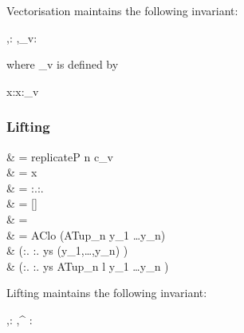 \documentclass{article}
\begin{document}
Vectorisation maintains the following invariant:

\begin{haskell}
\Delta,\Gamma{}:\sigma \Longrightarrow
      \Delta,\Gamma_v\vdash{}:\vect{\sigma}
\end{haskell}

where \<\Gamma_v\> is defined by

\begin{haskell}
x:\sigma\in\Gamma \Longleftrightarrow x:\vect{\sigma}\in\Gamma_v
\end{haskell}

\subsubsection*{Lifting}
\begin{haskell}
 & = replicateP \pa{\vect{\sigma}} n c_v \\
        & = x \\
 & =
\Lambda\alpha:\kappa.:\patype{\alpha:\kappa}. \\
 &  = [\vect{\sigma}] \pa{\vect{\sigma}} \\
 & =  \cappP {} \\
 & = AClo \vect{\sigma} \vect{\phi} \vect{\tau}
                                   \pa{\vect{\tau}}
                                   (ATup_n y_1 \dots y_n) \\
  &
\quad\quad(:\vect{\tau}.
           :\vect{\sigma}.
            ys  (y_1,\dots,y_n) \to {}) \\
  &
\quad\quad(:\parr{\vect{\tau}}.
           :\parr{\vect{\sigma}}.
            ys  ATup_n l y_1 \dots y_n \to {})
\end{haskell}

Lifting maintains the following invariant:

\begin{haskell}
\Delta,\Gamma{}:\sigma \Longrightarrow
  \Delta,\Gamma^\uparrow\vdash{} : 
\end{haskell}
\end{document}
